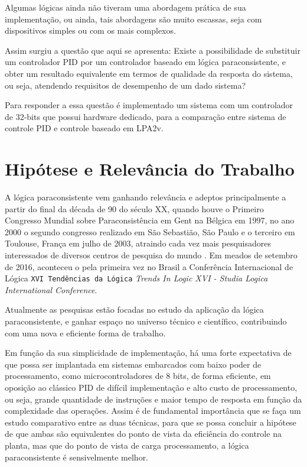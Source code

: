 Algumas lógicas ainda não tiveram  uma abordagem prática de sua implementação, ou ainda, tais abordagens são muito escassas, seja com dispositivos simples ou com os mais complexos.

Assim surgiu a questão que aqui se apresenta: Existe a possibilidade de substituir um controlador PID por um controlador baseado em lógica paraconsistente, e obter um resultado equivalente em termos de qualidade da resposta do sistema, ou seja, atendendo requisitos de desempenho de um dado sistema? 

Para responder a essa questão é implementado um sistema com um controlador de 32-bits que possui hardware dedicado, para a comparação entre sistema de controle PID e controle baseado em LPA2v.



\section{Hipótese e Relevância do Trabalho}

A lógica paraconsistente vem ganhando relevância e adeptos principalmente a partir do final da década de 90 do século XX, quando houve o Primeiro Congresso Mundial sobre Paraconsistência em Gent na Bélgica em 1997, no ano 2000 o segundo congresso realizado em São Sebastião, São Paulo e o terceiro em Toulouse, França em julho de 2003, atraindo cada vez mais pesquisadores interessados de diversos centros de pesquisa do mundo \cite{DecioKrause}. Em meados de setembro de 2016, aconteceu o pela primeira vez no Brasil a Conferência Internacional de Lógica \texttt{XVI Tendências da Lógica} \emph{Trends In Logic XVI - Studia Logica International Conference}.

Atualmente as pesquisas estão focadas no estudo da aplicação da lógica paraconsistente, e ganhar espaço no universo técnico e científico, contribuindo com uma nova e eficiente forma de trabalho.

Em função da sua simplicidade de implementação, há uma forte expectativa de que possa ser implantada em sistemas embarcados com baixo poder de processamento, como microcontroladores de 8 bits, de forma eficiente, em oposição ao clássico PID de difícil implementação e alto custo de processamento, ou seja, grande quantidade de instruções e maior tempo de resposta em função da complexidade das operações. Assim é de fundamental importância que se faça um estudo comparativo entre as duas técnicas, para que se possa concluir a hipótese de que ambas são equivalentes do ponto de vista da eficiência do controle na planta, mas que do ponto de vista de carga processamento, a lógica paraconsistente é sensivelmente melhor.



